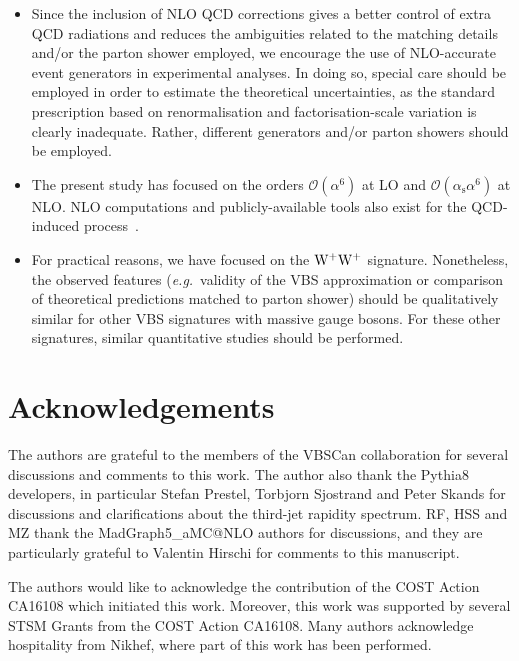 \documentclass[twocolumn,epjc3]{svjour3} %
\newcommand{\alphas}{\ensuremath{\alpha_\text{s}}\xspace}
\begin{document}
\begin{itemize}
    \item Since the inclusion of NLO QCD corrections gives a better control of extra QCD radiations and reduces the ambiguities related to the 
        matching details and/or the parton shower employed, we encourage the use of NLO-accurate event generators in experimental analyses. In doing
        so, special care should be employed in order to estimate the theoretical uncertainties, as the standard prescription based on 
        renormalisation and factorisation-scale variation is clearly inadequate. Rather, different generators and/or parton showers should be employed.

    \item The present study has focused on the orders $\mathcal{O}{\left(\alpha^{6}\right)}$ at 
    LO and $\mathcal{O}{\left(\alphas\alpha^{6}\right)}$ at NLO. NLO computations and publicly-available tools also exist for the QCD-induced process~\cite{Rauch:2016pai,Melia:2010bm,Melia:2011gk,Campanario:2013gea,Baglio:2014uba,Biedermann:2017bss,Alwall:2014hca}.

    \item For practical reasons, we have focused on the ${\rm W}^+{\rm W}^+$ signature. Nonetheless, 
    the observed features 
    (\emph{e.g.}\ validity of the VBS approximation or comparison of theoretical predictions matched to parton shower) should 
    be qualitatively similar for other VBS signatures with massive gauge bosons. For these other signatures, similar quantitative studies should be performed.
\end{itemize}


\section*{Acknowledgements}

The authors are grateful to the members of the VBSCan collaboration for several discussions and comments to this work. The author also thank
the {\sc Pythia8} developers, in particular Stefan Prestel, Torbjorn Sjostrand and Peter Skands for 
discussions and clarifications about the third-jet rapidity spectrum. RF, HSS and MZ thank the {\sc MadGraph5\_aMC@NLO} authors for discussions, and
they are particularly grateful to Valentin Hirschi for comments to this manuscript.

The authors would like to acknowledge the contribution of the COST Action CA16108 which initiated this work.
Moreover, this work was supported by several STSM Grants from the COST Action CA16108.
Many authors acknowledge hospitality from Nikhef, where part of this work has been performed.
\end{document}
